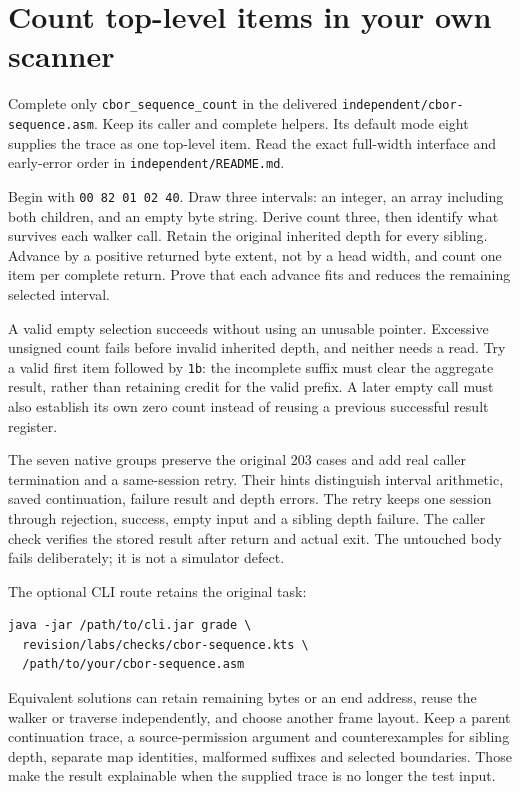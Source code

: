 \section{Count top-level items in your own scanner}

Complete only \texttt{cbor\_sequence\_count} in the delivered
\texttt{independent/cbor-sequence.asm}. Keep its caller and complete helpers.
Its default mode eight supplies the trace as one top-level item. Read the exact
full-width interface and early-error order in \texttt{independent/README.md}.

Begin with \texttt{00 82 01 02 40}. Draw three intervals: an integer, an array
including both children, and an empty byte string. Derive count three, then
identify what survives each walker call. Retain the original inherited depth for
every sibling. Advance by a positive returned byte extent, not by a head width,
and count one item per complete return. Prove that each advance fits and reduces
the remaining selected interval.

A valid empty selection succeeds without using an unusable pointer. Excessive
unsigned count fails before invalid inherited depth, and neither needs a read.
Try a valid first item followed by \texttt{1b}: the incomplete suffix must clear
the aggregate result, rather than retaining credit for the valid prefix. A later
empty call must also establish its own zero count instead of reusing a previous
successful result register.

The seven native groups preserve the original 203 cases and add real caller
termination and a same-session retry. Their hints distinguish interval arithmetic,
saved continuation, failure result and depth errors. The retry keeps one session
through rejection, success, empty input and a sibling depth failure. The caller
check verifies the stored result after return and actual exit. The untouched body
fails deliberately; it is not a simulator defect.

The optional CLI route retains the original task:
\begin{verbatim}
java -jar /path/to/cli.jar grade \
  revision/labs/checks/cbor-sequence.kts \
  /path/to/your/cbor-sequence.asm
\end{verbatim}
Equivalent solutions can retain remaining bytes or an end address, reuse the
walker or traverse independently, and choose another frame layout. Keep a parent
continuation trace, a source-permission argument and counterexamples for sibling
depth, separate map identities, malformed suffixes and selected boundaries. Those
make the result explainable when the supplied trace is no longer the test input.





